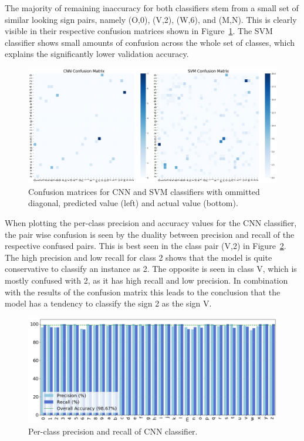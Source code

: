 \documentclass[a4, 10 pt, conference]{ieeeconf}  %
\begin{document}
The majority of remaining inaccuracy for both classifiers stem from a small set of similar
looking sign pairs, namely (O,0), (V,2), (W,6), and (M,N). This is clearly visible
in their respective confusion matrices shown in Figure~\ref{fig:cm}. The SVM 
classifier shows small amounts of confusion across the whole set of classes,
which explains the significantly lower validation accuracy.

\begin{figure}[htb]
  \centering
  \includegraphics[width=\linewidth]{../images/cm_comparison.png}
  \caption{Confusion matrices for CNN and SVM classifiers with ommitted diagonal, predicted value (left) and actual value (bottom).}
  \label{fig:cm}
\end{figure}

When plotting the per-class precision and accuracy values for the CNN classifier,
the pair wise confusion is seen by the duality between precision and recall of the 
respective confused pairs. This is best seen in the class pair (V,2) in 
Figure~\ref{fig:class_precision_recall}. The high precision and low recall for
class 2 shows that the model is quite conservative to classify an instance as 2. 
The opposite is seen in class V, which is mostly confused with 2, as it has high
recall and low precision. In combination with the results of the confusion matrix
this leads to the conclusion that the model has a tendency to classify the sign 2
as the sign V.

\begin{figure}[htb]
  \centering
  \includegraphics[width=\linewidth]{../images/class_accuracy_cnn.png}
  \caption{Per-class precision and recall of CNN classifier.}
  \label{fig:class_precision_recall}
\end{figure}
\end{document}

